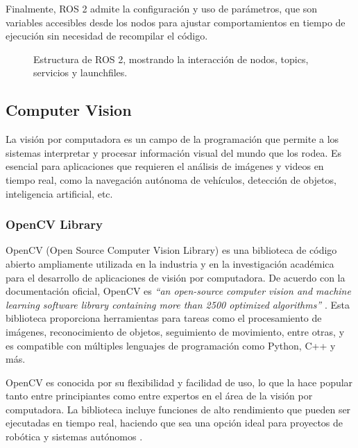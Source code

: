     Finalmente, ROS 2 admite la configuración y uso de parámetros, que son variables accesibles desde los nodos para ajustar comportamientos en tiempo de ejecución sin necesidad de recompilar el código.

    \begin{figure}[h!] 
    \centering 
    \caption{Estructura de ROS 2, mostrando la interacción de nodos, topics, servicios y launchfiles.}
    \label{fig} 
    \end{figure}

\subsection{Computer Vision}
    

    La visión por computadora es un campo de la programación que permite a los sistemas interpretar y procesar información visual del mundo que los rodea. Es esencial para aplicaciones que requieren el análisis de imágenes y videos en tiempo real, como la navegación autónoma de vehículos, detección de objetos, inteligencia artificial, etc.

    \subsubsection{OpenCV Library}

    OpenCV (Open Source Computer Vision Library) es una biblioteca de código abierto ampliamente utilizada en la industria y en la investigación académica para el desarrollo de aplicaciones de visión por computadora. De acuerdo con la documentación oficial, OpenCV es \textit{“an open-source computer vision and machine learning software library containing more than 2500 optimized algorithms”} \cite{opencv_docs}. Esta biblioteca proporciona herramientas para tareas como el procesamiento de imágenes, reconocimiento de objetos, seguimiento de movimiento, entre otras, y es compatible con múltiples lenguajes de programación como Python, C++ y más.

    OpenCV es conocida por su flexibilidad y facilidad de uso, lo que la hace popular tanto entre principiantes como entre expertos en el área de la visión por computadora. La biblioteca incluye funciones de alto rendimiento que pueden ser ejecutadas en tiempo real, haciendo que sea una opción ideal para proyectos de robótica y sistemas autónomos \cite{arevalo2004}.

